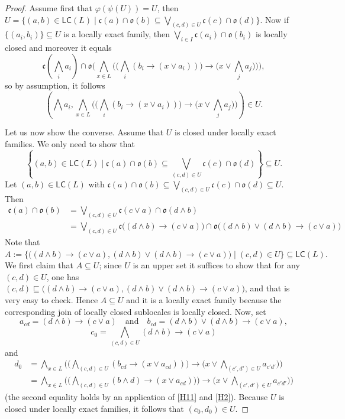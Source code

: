 \documentclass[10pt,a4paper]{amsart}
\newcommand{\cat}[1]{\ensuremath{\mathsf{#1}}} %
\def\cl{\mathfrak{c}}
\def\op{\mathfrak{o}}
\newcommand{\tbigvee}{\mathop{\textstyle \bigvee }}%
\newcommand{\tbigwedge}{\mathop{\textstyle \bigwedge }}%
\begin{document}
\begin{proof}
Assume first that  $\varphi(\psi(U))=U$, then $U=\{ (a,b)\in \mathsf{LC}(L)\mid \cl(a)\cap\op(b)\subseteq \tbigvee_{(c,d)\in U}\cl(c)\cap\op(d)\}$. Now if $\{(a_i,b_i)\}\subseteq U$ is a locally exact family, then $\tbigvee_{i\in I}\cl(a_i)\cap\op(b_i)$ is locally closed and moreover it equals 
$$\cl(\tbigwedge_i a_i)\cap \op\biggl(   \tbigwedge_{x\in L} \biggl(  \big(\tbigwedge _i (b_i\to (x\vee a_i)) \big) \to \big( x\vee  \tbigwedge_j a_j\bigr) \biggr) \biggr),$$
so by assumption, it follows $$\left(\tbigwedge a_i,   \tbigwedge_{x\in L} \biggl(  \big(\tbigwedge _i (b_i\to (x\vee a_i)) \big) \to \big( x\vee  \tbigwedge_j a_j\bigr) \biggr)\right)\in U.$$

Let us now show the converse. Assume that $U$ is closed under locally exact families. We only need to show that $$\left\{ (a,b)\in \mathsf{LC}(L)\mid \cl(a)\cap\op(b)\subseteq \tbigvee_{(c,d)\in U}\cl(c)\cap\op(d)\right\}\subseteq U.$$
Let $(a,b)\in \mathsf{LC}(L)$ with $ \cl(a)\cap\op(b)\subseteq \tbigvee_{(c,d)\in U}\cl(c)\cap\op(d)\subseteq U$. 
Then
\begin{align*}\cl(a)\cap \op(b)&= \tbigvee_{(c,d)\in U}\cl(c\vee a)\cap\op(d\wedge b) \\ &=\tbigvee_{(c,d)\in U}\cl\bigl((d\wedge b)\to (c\vee a)\bigr)\cap\op\bigl((d\wedge b)\vee (d\wedge b)\to(c\vee a)\bigr)
\end{align*}
Note that $A:=\biggl\{ \bigl((d\wedge b)\to (c\vee a), (d\wedge b)\vee (d\wedge b)\to (c\vee a)\bigr) \mid (c,d)\in U\biggr\}\subseteq \cat{LC}(L).$
We first claim that $ A\subseteq U$; since $U$ is an upper set it suffices to show that for any $(c,d)\in U$, one has $(c,d)\sqsubseteq  \bigl((d\wedge b)\to (c\vee a), (d\wedge b)\vee (d\wedge b)\to (c\vee a)\bigr)$, and that is very easy to check.
Hence $A\subseteq U$ and it is a locally exact family because the corresponding join of locally closed sublocales is locally closed. Now, set
$$a_{cd}=(d\wedge b)\to (c\vee a)\quad\text{and}\quad b_{cd}= (d\wedge b)\vee (d\wedge b)\to (c\vee a),$$
$$c_0=  \tbigwedge_{(c,d)\in U} (d\wedge b)\to (c\vee a)$$
and
\begin{align*}d_0&=  \tbigwedge_{x\in L} \biggl(  \big(\tbigwedge _{(c,d)\in U}(b_{cd}\to (x\vee a_{cd})) \big) \to \big( x\vee  \tbigwedge_{(c',d')\in U} a_{c'd'}\bigr)\biggr)\\&=
  \tbigwedge_{x\in L} \biggl(  \big(\tbigwedge _{(c,d)\in U}(b\wedge d)\to (x\vee a_{cd})) \big) \to \big( x\vee  \tbigwedge_{(c',d')\in U} a_{c'd'}\bigr)\biggr)
\end{align*}
(the second equality holds by an application of \ref{H11} and \ref{H2}).  Because $U$ is closed under locally exact families, it follows that $(c_0,d_0)\in U$.


\end{proof}
\end{document}
